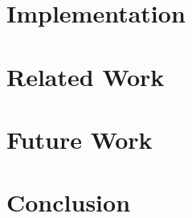 \documentclass[master=mai, masteroption=ecs]{kulemt}
\begin{document}
\chapter{Implementation}


\chapter{Related Work}\label{related}


\chapter{Future Work}


\chapter{Conclusion}\label{conclusion}



\backmatter



\end{document}

